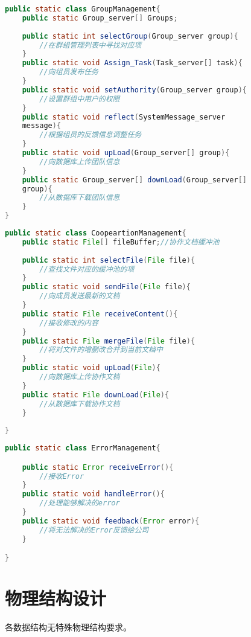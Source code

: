 \begin{lstlisting}[language=Java, caption=团队管理类]
public static class GroupManagement{
    public static Group_server[] Groups;
    
    public static int selectGroup(Group_server group){
        //在群组管理列表中寻找对应项
    }
    public static void Assign_Task(Task_server[] task){
        //向组员发布任务
    }
    public static void setAuthority(Group_server group){
        //设置群组中用户的权限
    }
    public static void reflect(SystemMessage_server 
    message){
        //根据组员的反馈信息调整任务
    }
    public static void upLoad(Group_server[] group){
        //向数据库上传团队信息
    }
    public static Group_server[] downLoad(Group_server[] 
    group){
        //从数据库下载团队信息
    }
}
\end{lstlisting}

\begin{lstlisting}[language=Java, caption=在线协作类]
public static class CoopeartionManagement{
    public static File[] fileBuffer;//协作文档缓冲池
    
    public static int selectFile(File file){
        //查找文件对应的缓冲池的项
    }
    public static void sendFile(File file){
        //向成员发送最新的文档
    }
    public static File receiveContent(){
        //接收修改的内容
    }
    public static File mergeFile(File file){
        //将对文件的增删改合并到当前文档中
    }
    public static void upLoad(File){
        //向数据库上传协作文档
    }
    public static File downLoad(File){
        //从数据库下载协作文档
    }
    
} 
\end{lstlisting}
\begin{lstlisting}[language=Java, caption=在线协作类]
public static class ErrorManagement{

    public static Error receiveError(){
        //接收Error
    }
    public static void handleError(){
        //处理能够解决的error
    }
    public static void feedback(Error error){
        //将无法解决的Error反馈给公司
    }

} 
\end{lstlisting}

    \section{物理结构设计}
        各数据结构无特殊物理结构要求。
